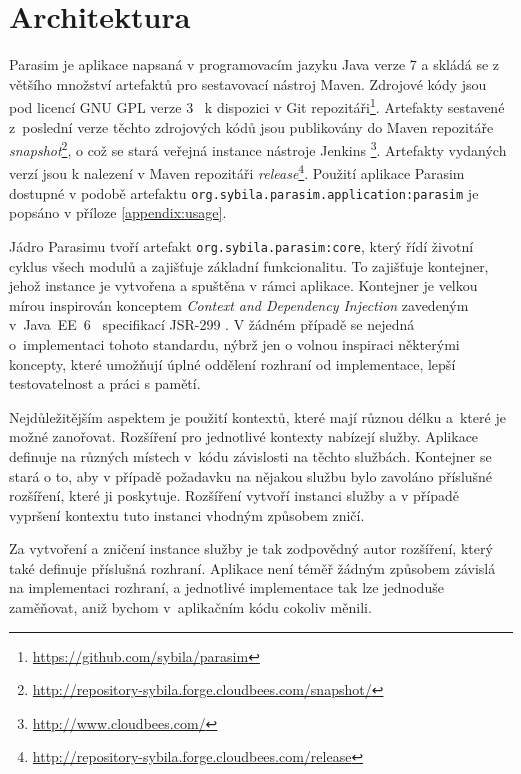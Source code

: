 \section{Architektura}

Parasim je aplikace napsaná v programovacím jazyku Java verze 7 a skládá se z většího množství artefaktů pro
sestavovací nástroj Maven. Zdrojové kódy jsou pod licencí GNU GPL verze 3~\cite{gpl} k dispozici
v Git \cite{chacon2009} repozitáři\footnote{\url{https://github.com/sybila/parasim}}. Artefakty sestavené
z~poslední verze těchto zdrojových kódů jsou publikovány do Maven repozitáře \textit{snapshot}\footnote{\url{http://repository-sybila.forge.cloudbees.com/snapshot/}}, o což se stará veřejná
instance nástroje Jenkins \cite{jenkins}\footnote{\url{http://www.cloudbees.com/}}. Artefakty
vydaných verzí jsou k nalezení v Maven repozitáři \textit{release}\footnote{\url{http://repository-sybila.forge.cloudbees.com/release}}.
Použití aplikace Parasim dostupné v podobě artefaktu \texttt{org.sybila.parasim.application:parasim}
je popsáno v pří\-lo\-ze \ref{appendix:usage}.

Jádro Parasimu tvoří artefakt \texttt{org.sybila.parasim:core}, který řídí ži\-vot\-ní
cyklus všech modulů a zajišťuje základní funkcionalitu. To zajišťuje kontejner,
jehož instance je vytvořena a spuštěna v rámci aplikace. Kontejner je velkou mírou inspi\-ro\-ván
konceptem \textit{Context and Dependency Injection} zavedeným v~Java~EE~6~\cite{jendrock2010} specifikací
JSR-299 \cite{jsr299}. V žádném případě se nejedná o~implementaci tohoto standardu,
nýbrž jen o volnou inspiraci některými koncepty, které umožňují úplné oddělení rozhraní
od implementace, lepší testovatelnost a práci s pamětí.

Nejdůležitějším aspektem je použití kontextů, které mají různou délku a~kte\-ré je možné za\-no\-řo\-vat.
Rozšíření pro jednotlivé kontexty nabízejí služ\-by. Aplikace definuje na různých
místech v~kódu závislosti na těchto služ\-bách. Kontejner se stará o to,
aby v případě požadavku na nějakou službu bylo zavoláno příslušné rozšíření,
které ji poskytuje. Rozšíření vytvoří instanci služby a v případě vy\-pr\-še\-ní kontextu
tuto instanci vhodným způ\-so\-bem zničí.

Za vytvoření a zničení instance služby je tak zodpovědný autor rozšíření,
který také definuje příslušná rozhraní. Aplikace není téměř žádným způ\-so\-bem závislá
na implementaci rozhraní, a jednotlivé implementace tak lze jednoduše zaměňovat,
aniž bychom v~aplikačním kódu cokoliv mě\-ni\-li.

